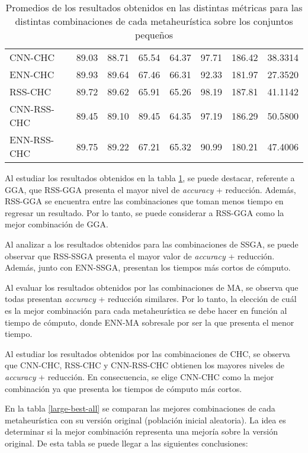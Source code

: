 \begin{table}[h!]
\begin{adjustbox}{max width =\textwidth}
\begin{tabular}{l c c c c c c c}
\hline

CNN-CHC & 89.03 & 88.71 & 65.54 & 64.37 & 97.71 & 186.42 & 38.3314 \\
ENN-CHC & 89.93 & 89.64 & 67.46 & 66.31 & 92.33 & 181.97 & 27.3520 \\
RSS-CHC & 89.72 & 89.62 & 65.91 & 65.26 & 98.19 & 187.81 & 41.1142 \\
CNN-RSS-CHC & 89.45 & 89.10 & 89.45 & 64.35 & 97.19 & 186.29 & 50.5800 \\
ENN-RSS-CHC & 89.75 & 89.22 & 67.21 & 65.32 & 90.99 & 180.21 & 47.4006 \\

\hline
\end{tabular}
\end{adjustbox}
\caption{Promedios de los resultados obtenidos en las distintas métricas para las distintas combinaciones de cada metaheurística sobre los conjuntos pequeños}
\label{grande-all}

\end{table}

Al estudiar los resultados obtenidos en la tabla \ref{grande-all}, se puede destacar, referente a GGA, que RSS-GGA presenta el mayor nivel de \emph{accuracy} + reducción. Además, RSS-GGA se encuentra entre las combinaciones que toman menos tiempo en regresar un resultado. Por lo tanto, se puede considerar a RSS-GGA como la mejor combinación de GGA.

Al analizar a los resultados obtenidos para las combinaciones de SSGA, se puede observar que RSS-SSGA presenta el mayor valor de \emph{accuracy} + reducción. Además, junto con ENN-SSGA, presentan los tiempos más cortos de cómputo. 

Al evaluar los resultados obtenidos por las combinaciones de MA, se observa que todas presentan \emph{accuracy} + reducción similares. Por lo tanto, la elección de cuál es la mejor combinación para cada metaheurística se debe hacer en función al tiempo de cómputo, donde ENN-MA sobresale por ser la que presenta el menor tiempo.

Al estudiar los resultados obtenidos por las combinaciones de CHC, se observa que CNN-CHC, RSS-CHC y CNN-RSS-CHC obtienen los mayores niveles de \emph{accuracy} + reducción. En consecuencia, se elige CNN-CHC como la mejor combinación ya que presenta los tiempos de cómputo más cortos.


En la tabla \ref{large-best-all} se comparan las mejores combinaciones de cada metaheurística con su versión original (población inicial aleatoria). La idea es determinar si la mejor combinación representa una mejoría sobre la versión original. De esta tabla se puede llegar a las siguientes conclusiones:

